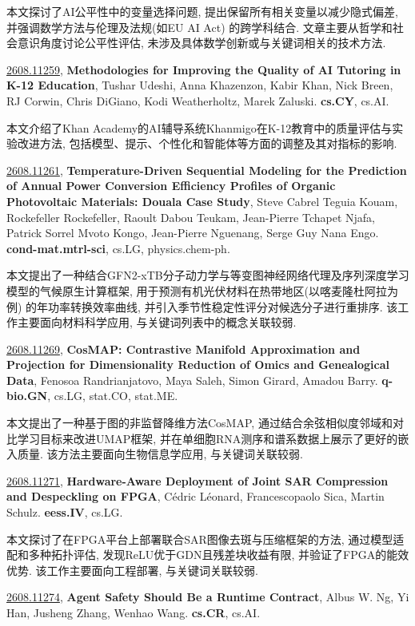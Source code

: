 \documentclass[9pt, a4paper]{article}
\theoremstyle{plain}
\theoremstyle{definition}
\theoremstyle{remark}
\newcommand{\arxivwithtarget}[3]{\hypertarget{#1}{}\href{https://arxiv.org/abs/#1}{#1}, \textbf{\textcolor{arxivblue}{#2}}, #3. }
\begin{document}
本文探讨了AI公平性中的变量选择问题, 提出保留所有相关变量以减少隐式偏差, 并强调数学方法与伦理及法规(如EU AI Act) 的跨学科结合. 文章主要从哲学和社会意识角度讨论公平性评估, 未涉及具体数学创新或与关键词相关的技术方法.


\arxivwithtarget{2608.11259}{Methodologies for Improving the Quality of AI Tutoring in K-12 Education}{Tushar Udeshi, Anna Khazenzon, Kabir Khan, Nick Breen, RJ Corwin, Chris DiGiano, Kodi Weatherholtz, Marek Zaluski}\textbf{cs.CY}, cs.AI.

本文介绍了Khan Academy的AI辅导系统Khanmigo在K-12教育中的质量评估与实验改进方法, 包括模型、提示、个性化和智能体等方面的调整及其对指标的影响.


\arxivwithtarget{2608.11261}{Temperature-Driven Sequential Modeling for the Prediction of Annual Power Conversion Efficiency Profiles of Organic Photovoltaic Materials: Douala Case Study}{Steve Cabrel Teguia Kouam, Rockefeller Rockefeller, Raoult Dabou Teukam, Jean-Pierre Tchapet Njafa, Patrick Sorrel Mvoto Kongo, Jean-Pierre Nguenang, Serge Guy Nana Engo}\textbf{cond-mat.mtrl-sci}, cs.LG, physics.chem-ph.

本文提出了一种结合GFN2-xTB分子动力学与等变图神经网络代理及序列深度学习模型的气候原生计算框架, 用于预测有机光伏材料在热带地区(以喀麦隆杜阿拉为例) 的年功率转换效率曲线, 并引入季节性稳定性评分对候选分子进行重排序. 该工作主要面向材料科学应用, 与关键词列表中的概念关联较弱.


\arxivwithtarget{2608.11269}{CosMAP: Contrastive Manifold Approximation and Projection for Dimensionality Reduction of Omics and Genealogical Data}{Fenosoa Randrianjatovo, Maya Saleh, Simon Girard, Amadou Barry}\textbf{q-bio.GN}, cs.LG, stat.CO, stat.ME.

本文提出了一种基于图的非监督降维方法CosMAP, 通过结合余弦相似度邻域和对比学习目标来改进UMAP框架, 并在单细胞RNA测序和谱系数据上展示了更好的嵌入质量. 该方法主要面向生物信息学应用, 与关键词关联较弱.


\arxivwithtarget{2608.11271}{Hardware-Aware Deployment of Joint SAR Compression and Despeckling on FPGA}{Cédric Léonard, Francescopaolo Sica, Martin Schulz}\textbf{eess.IV}, cs.LG.

本文探讨了在FPGA平台上部署联合SAR图像去斑与压缩框架的方法, 通过模型适配和多种拓扑评估, 发现ReLU优于GDN且残差块收益有限, 并验证了FPGA的能效优势. 该工作主要面向工程部署, 与关键词关联较弱.


\arxivwithtarget{2608.11274}{Agent Safety Should Be a Runtime Contract}{Albus W. Ng, Yi Han, Jusheng Zhang, Wenhao Wang}\textbf{cs.CR}, cs.AI.
\end{document}
